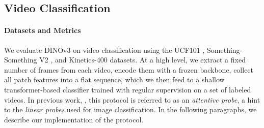 \subsection{Video Classification}
\label{app:exp-details:video-classification}

\paragraph{Datasets and Metrics}
We evaluate DINOv3 on video classification using the UCF101 \citep{soomro2012ucf101}, Something-Something V2 \citep{goyal2017something}, and Kinetics-400 \citep{kay2017kinetics} datasets.
At a high level, we extract a fixed number of frames from each video, encode them with a frozen backbone, collect all patch features into a flat sequence, which we then feed to a shallow transformer-based classifier trained with regular supervision on a set of labeled videos.
In previous work, \eg \citep{assran2025vjepa2}, this protocol is referred to as an \emph{attentive probe}, a hint to the \emph{linear probes} used for image classification.
In the following paragraphs, we describe our implementation of the protocol.

